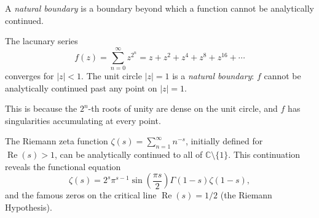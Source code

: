 \begin{definition}
  A \emph{natural boundary} is a boundary beyond which a function cannot be analytically continued.
\end{definition}

\begin{example}
  The lacunary series
  \[
    f(z) = \sum_{n=0}^{\infty} z^{2^n} = z + z^2 + z^4 + z^8 + z^{16} + \cdots
  \]
  converges for $|z| < 1$. The unit circle $|z| = 1$ is a \emph{natural boundary}: $f$ cannot be analytically continued past any point on $|z| = 1$.

  This is because the $2^n$-th roots of unity are dense on the unit circle, and $f$ has singularities accumulating at every point.
\end{example}

\begin{center}
\end{center}

\begin{remark}
  The Riemann zeta function $\zeta(s) = \sum_{n=1}^{\infty} n^{-s}$, initially defined for $\operatorname{Re}(s) > 1$, can be analytically continued to all of $\mathbb{C} \setminus \{1\}$. This continuation reveals the functional equation
  \[
    \zeta(s) = 2^s \pi^{s-1} \sin\left(\frac{\pi s}{2}\right) \Gamma(1-s) \zeta(1-s),
  \]
  and the famous zeros on the critical line $\operatorname{Re}(s) = 1/2$ (the Riemann Hypothesis).
\end{remark}

